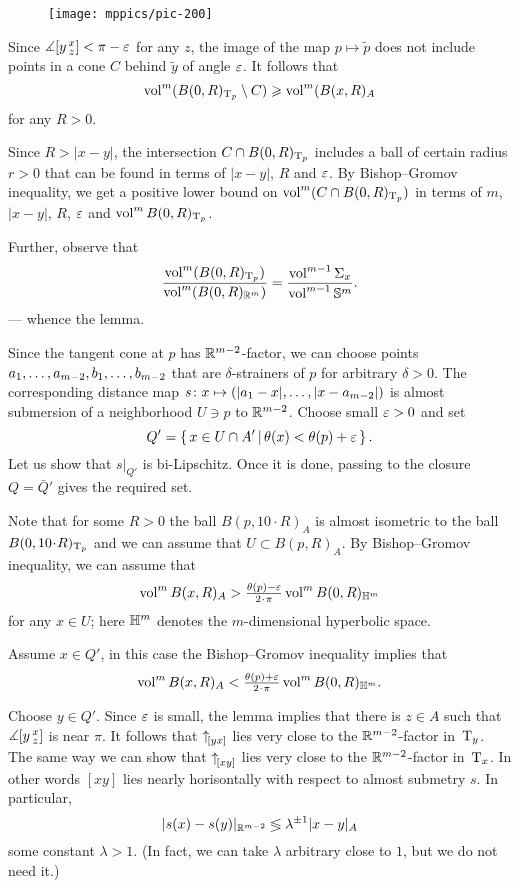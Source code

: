 \begin{wrapfigure}{r}{35 mm}
\vskip-0mm
\centering
\texttt{[image: mppics/pic-200]}
\vskip0mm
\end{wrapfigure}

Since $\measuredangle[y\,{}^{x}_{z}]<\pi-\varepsilon$ for any $z$, the image of the map $p\mapsto \tilde p$ does not include points in a cone $C$ behind $\tilde y$ of angle $\varepsilon$.
It follows that 
\[\operatorname{vol}^m(B(0,R)_{\mathrm{T}_p}\setminus C)\geqslant \operatorname{vol}^m(B(x,R)_A\]
for any $R>0$.

Since $R>|x-y|$, the intersection $C\zz\cap B(0,R)_{\T_p}$ includes a ball of certain radius $r>0$ that can be found in terms of $|x-y|$, $R$ and $\varepsilon$.
By Bishop--Gromov inequality, we get a positive lower bound on $\operatorname{vol}^m(C\cap B(0,R)_{\mathrm{T}_p})$ in terms of $m$, $|x-y|$, $R$, $\varepsilon$ and $\operatorname{vol}^mB(0,R)_{\mathrm{T}_p}$.

Further, observe that 
\[\frac{\operatorname{vol}^m(B(0,R)_{\mathrm{T}_p})}{\operatorname{vol}^m(B(0,R)_{\mathbb{R}^m})}
=
\frac{\operatorname{vol}^{m-1} \Sigma_x}{\operatorname{vol}^{m-1} \mathbb{S}^m}.
\]
--- whence the lemma.
\qeds







Since the tangent cone at $p$ has $\mathbb{R}^{m-2}$-factor, 
we can choose points $a_1,\zz\dots,a_{m-2},b_1,\zz\dots,b_{m-2}$ that are $\delta$-strainers of $p$ for arbitrary $\delta>0$.
The corresponding distance map $s\:x\zz\mapsto (|a_1-x|,\zz\dots,|x-a_{m-2}|)$ is almost submersion of a neighborhood $U\ni p$ to $\mathbb{R}^{m-2}$.
Choose small $\varepsilon>0$ and set 
\[Q'=\left\{\,x\in U\cap A'\,\middle|\,\theta(x)<\theta(p)+\varepsilon\,\right\}.\]
Let us show that $s|_{Q'}$ is bi-Lipschitz.
Once it is done, passing to the closure $Q=\bar Q'$ gives the required set. 

Note that for some $R>0$ the ball $B(p,10\cdot R)_A$ is almost isometric to the ball $B(0,10\cdot R)_{\T_p}$
and we can assume that $U\subset B(p,R)_A$.
By Bishop--Gromov inequality, we can assume that 
\[\vol^m B(x,R)_A>\tfrac{\theta(p)-\eps}{2\cdot \pi}\vol^m B(0,R)_{\HH^m}\]
for any $x\in U$; here $\mathbb{H}^m$ denotes the $m$-dimensional hyperbolic space. 

Assume $x\in Q'$, in this case the Bishop--Gromov inequality implies that 
\[\vol^m B(x,R)_A< \tfrac{\theta(p)+\eps}{2\cdot \pi}\vol^m B(0,R)_{\HH^m}.\]

Choose $y\in Q'$.
Since $\varepsilon$ is small, the lemma implies that there is $z\in A$ such that $\measuredangle[y\,{}^{x}_{z}]$ is near $\pi$.
It follows that ${\uparrow}_{\hskip-0.15em[{y}{x}]}$ lies very close to the $\mathbb{R}^{m-2}$-factor in~$\mathrm{T}_y$.
The same way we can show that ${\uparrow}_{\hskip-0.15em[{x}{y}]}$ lies very close to the $\mathbb{R}^{m-2}$-factor in~$\mathrm{T}_x$.
In other words $[xy]$ lies nearly horisontally with respect to almost submetry $s$.
In particular,  
\[|s(x)-s(y)|_{\mathbb{R}^{m-2}} \lessgtr \lambda^{\pm1}|x-y|_{A}\]
some constant $\lambda>1$.
(In fact, we can take $\lambda$ arbitrary close to $1$, but we do not need it.)
\qeds
